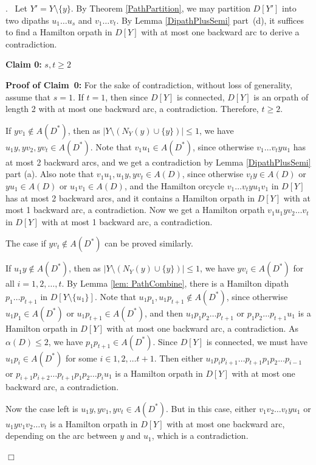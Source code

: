 \documentclass{article}
\newcommand{\2}{\vspace{2mm}}
\renewenvironment{proof}[1][]{\par \noindent {\bf Proof#1}.\ }{\hfill$\Box$
\par \vspace{11pt}}
\theoremstyle{definition}
\begin{document}
\begin{proof}
Let $Y'=Y \setminus \{y\}$. By Theorem \ref{PathPartition}, we may partition $D[Y']$ into two dipaths $u_1\dots u_s$ and $v_1 \dots v_t$.
By Lemma \ref{DipathPlusSemi} part~(d), it suffices to find a Hamilton orpath in $D[Y]$ with at most one backward arc to derive a contradiction.

\2

{\bf Claim 0:} {\em $s,t \ge 2$}

\2

{\bf Proof of Claim~0:}
For the sake of contradiction, without loss of generality, assume that $s=1$. If $t=1$, then since $D[Y]$ is connected, $D[Y]$ is an orpath of length 2 with at most one backward arc, a contradiction. Therefore, $t \ge 2$. 


If $yv_1 \notin A(D^*)$, then as $|Y \setminus (N_Y(y) \cup \{y\})| \le 1$, we have $u_1y, yv_2, yv_t \in A(D^*)$. Note that $v_1u_1\in  A(D^*)$, since otherwise $v_1 \dots v_t y u_1$ has at most 2 backward arcs, and we get a contradiction by Lemma \ref{DipathPlusSemi} part (a). Also note that $v_1u_1,u_1y, yv_t \in A(D)$, since otherwise $v_ty\in A(D)$ or $yu_1\in A(D)$ or $u_1v_1 \in A(D)$, and the Hamilton orcycle $v_1 \dots v_t y u_1 v_1$ in $D[Y]$ has at most 2 backward arcs, and it contains a Hamilton orpath in $D[Y]$ with at most 1 backward arc, a contradiction. Now we get a Hamilton orpath $v_1 u_1y v_2 \dots v_t$  in $D[Y]$ with at most 1 backward arc, a contradiction.

The case if $yv_t \notin  A(D^*)$ can be proved similarly.


If $u_1y \notin A(D^*)$, then as $|Y \setminus (N_Y(y) \cup \{y\})| \le 1$, we have $yv_i \in A(D^*)$ for all $i=1,2, \dots, t$. By Lemma \ref{lem: PathCombine}, there is a Hamilton dipath $p_1\dots p_{t+1}$ in $D[Y \setminus \{u_1\}]$.
Note that $u_1p_1,u_1p_{t+1} \notin A(D^*)$, since otherwise $u_1p_1 \in A(D^*)$ or $u_1p_{t+1} \in A(D^*)$, and then $u_1p_1p_2\dots p_{t+1}$ or $p_1p_2\dots p_{t+1}u_1$ is a Hamilton orpath in $D[Y]$ with at most one backward arc, a contradiction. As $\alpha(D) \le 2$, we have $p_1p_{t+1} \in A(D^*)$. Since $D[Y]$ is connected, we must have $u_1p_i \in A(D^*)$ for some $i \in 1,2, \dots t+1$. Then either $u_1p_ip_{i+1}\dots p_{t+1}p_1p_2 \dots p_{i-1}$ or $p_{i+1}p_{i+2}\dots p_{t+1}p_1p_2 \dots p_iu_1$ is a Hamilton orpath in $D[Y]$ with at most one backward arc, a contradiction.

Now the case left is $u_1y,yv_1,yv_t \in A(D^*)$. But in this case, either $v_1v_2\dots v_{t}yu_1$ or $u_1y v_1v_2\dots v_{t}$ is a Hamilton orpath in $D[Y]$ with at most one backward arc, depending on the arc between $y$ and $u_1$, which is a contradiction.


\end{proof}
\end{document}
